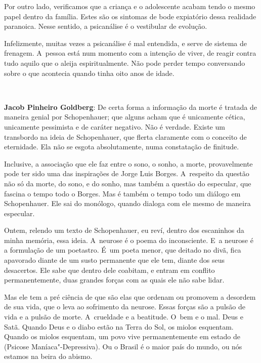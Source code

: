 Por outro lado, verificamos que a criança e o adolescente acabam tendo o
mesmo papel dentro da família. Estes são os sintomas de bode expiatório
dessa realidade paranoica. Nesse sentido, a psicanálise é o vestibular
de evolução.

Infelizmente, muitas vezes a psicanálise é mal entendida, e serve de
sistema de frenagem. A~pessoa está num momento com a intenção de viver,
de reagir contra tudo aquilo que o aleija espiritualmente. Não pode
perder tempo conversando sobre o que acontecia quando tinha oito anos de
idade.

\begin{center}\asterisc{}\ ~\end{center}

\abrefala

\textbf{Jacob Pinheiro Goldberg}: De certa forma a informação da morte
é tratada de maneira genial por Schopenhauer; que alguns acham que é
unicamente cética, unicamente pessimista e de caráter negativo. Não é
verdade. Existe um transbordo na ideia de Schopenhauer, que flerta
claramente com o conceito de eternidade. Ela não se esgota
absolutamente, numa constatação de finitude.

 

Inclusive, a associação que ele faz entre o sono, o sonho, a morte,
provavelmente pode ter sido uma das inspirações de Jorge Luis Borges. A~respeito da questão não só da morte, do sono, e do sonho, mas também a
questão do especular, que fascina o tempo todo o Borges. Mas é também o
tempo todo um diálogo em Schopenhauer. Ele sai do monólogo, quando
dialoga com ele mesmo de maneira especular.

 

Ontem, relendo um texto de Schopenhauer, eu reví, dentro dos escaninhos
da minha memória, essa ideia. A~neurose é o poema do inconsciente. E~a
neurose é a formulação de um poetastro. É~um poeta menor, que deitado no
divã, fica apavorado diante de um susto permanente que ele tem, diante
dos seus desacertos. Ele sabe que dentro dele coabitam, e entram em
conflito permanentemente, duas grandes forças com as quais ele não sabe
lidar.

 

Mas ele tem a pré ciência de que são elas que ordenam ou promovem a
desordem de sua vida, que o leva ao sofrimento da neurose. Essas forças
são a pulsão de vida e a pulsão de morte. A~crueldade e a beatitude. O~bem e o mal. Deus e Satã. Quando Deus e o diabo estão na Terra do Sol,
os miolos esquentam. Quando os miolos esquentam, um povo vive
permanentemente em estado de  (Psicose Maníaca"-Depressiva). Ou o
Brasil é o maior país do mundo, ou nós estamos na beira do abismo.


